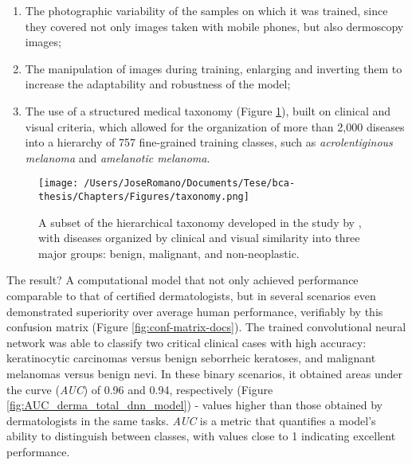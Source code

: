 \begin{enumerate}
  \item The photographic variability of the samples on which it was trained, since they
        covered not only images taken with mobile phones, but also dermoscopy images;

  \item The manipulation of images during training, enlarging and inverting them to
        increase the adaptability and robustness of the model;

  \item The use of a structured medical taxonomy (Figure \ref{fig:taxonomy}), built on
        clinical and visual criteria, which allowed for the organization of more than
        2{,}000 diseases into a hierarchy of 757 fine-grained training classes, such as
        \textit{acrolentiginous melanoma} and \textit{amelanotic melanoma}.
\end{enumerate}

\begin{figure}[htbp]
  \centering
  \texttt{[image: /Users/JoseRomano/Documents/Tese/bca-thesis/Chapters/Figures/taxonomy.png]}
  \caption{A subset of the hierarchical taxonomy developed in the study by \textcite{ai_in_dermacancer_esteva2017}, with diseases organized by clinical and visual similarity into three major groups: benign, malignant, and non-neoplastic.}
  \label{fig:taxonomy}
\end{figure}

The result? A computational model that not only achieved performance comparable
to that of certified dermatologists, but in several scenarios even demonstrated
superiority over average human performance, verifiably by this confusion matrix
(Figure \ref{fig:conf-matrix-docs}). The trained convolutional neural network
was able to classify two critical clinical cases with high accuracy:
keratinocytic carcinomas versus benign seborrheic keratoses, and malignant
melanomas versus benign nevi. In these binary scenarios, it obtained areas
under the curve (\textit{AUC}) of 0.96 and 0.94, respectively (Figure
\ref{fig:AUC_derma_total_dnn_model}) - values higher than those obtained by
dermatologists in the same tasks. \textit{AUC} is a metric that quantifies a
model's ability to distinguish between classes, with values close to 1
indicating excellent performance.

